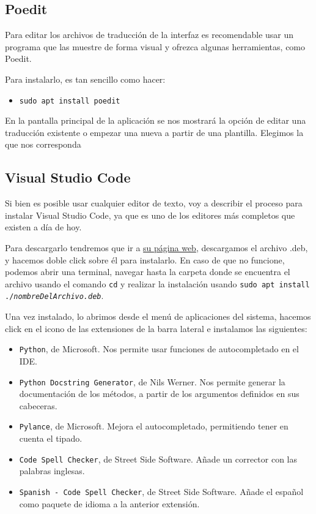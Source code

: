
\subsection{Poedit}
Para editar los archivos de traducción de la interfaz es recomendable usar un programa que las muestre de forma visual y ofrezca algunas herramientas, como Poedit.

Para instalarlo, es tan sencillo como hacer:
\begin{itemize}
    \item \texttt{sudo apt install poedit}
\end{itemize}

En la pantalla principal de la aplicación se nos mostrará la opción de editar una traducción existente o empezar una nueva a partir de una plantilla. Elegimos la que nos corresponda 

\subsection{Visual Studio Code}
Si bien es posible usar cualquier editor de texto, voy a describir el proceso para instalar Visual Studio Code, ya que es uno de los editores más completos que existen a día de hoy.

Para descargarlo tendremos que ir a \href{https://code.visualstudio.com/}{su página web}, descargamos el archivo .deb, y hacemos doble click sobre él para instalarlo. En caso de que no funcione, podemos abrir una terminal, navegar hasta la carpeta donde se encuentra el archivo usando el comando \texttt{cd} y realizar la instalación usando \texttt{sudo apt install ./\textit{nombreDelArchivo.deb}}.

Una vez instalado, lo abrimos desde el menú de aplicaciones del sistema, hacemos click en el icono de las extensiones de la barra lateral e instalamos las siguientes:
\begin{itemize}
    \item \texttt{Python}, de Microsoft. Nos permite usar funciones de autocompletado en el IDE.
    \item \texttt{Python Docstring Generator}, de Nils Werner. Nos permite generar la documentación de los métodos, a partir de los argumentos definidos en sus cabeceras.
    \item \texttt{Pylance}, de Microsoft. Mejora el autocompletado, permitiendo tener en cuenta el tipado.
    \item \texttt{Code Spell Checker}, de Street Side Software. Añade un corrector con las palabras inglesas.
    \item \texttt{Spanish - Code Spell Checker}, de Street Side Software. Añade el español como paquete de idioma a la anterior extensión.
\end{itemize}

